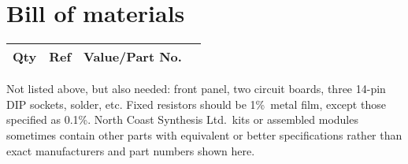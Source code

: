 
%
%
%
%
%
%

\onecolumn
\chapter{Bill of materials}

{\centering
{}

\begin{longtable}{rp{1.3in}cp{3in}}
  \textbf{Qty} & \textbf{Ref} & \textbf{Value/Part No.} & \\ \hline \endhead

\end{longtable}\par}

Not listed above, but also needed:  front panel, two circuit boards,
three 14-pin DIP sockets, solder, etc.
Fixed resistors should be 1\%\ metal film, except those specified as 0.1\%. 
North Coast Synthesis Ltd.\ kits or assembled modules sometimes contain
other parts with equivalent or better specifications rather than exact
manufacturers and part numbers shown here.

\twocolumn
